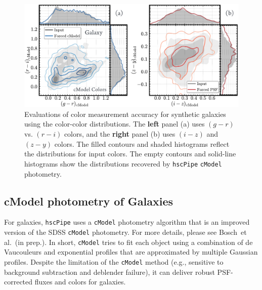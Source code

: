 \documentclass[useamsfonts]{pasj01}
\def\etal{{\ et al.~}}
\def\hscpipe{\texttt{hscPipe}}
\def\cmodel{\texttt{cModel}}
\begin{document}
\begin{figure}
    \begin{center}
        \includegraphics[width=\textwidth]{fig/synpipe_galaxy_cdist}
    \end{center}
    \caption{
        Evaluations of color measurement accuracy for synthetic galaxies
        using the color-color distributions.
        The \textbf{left} panel (a) uses $(g-r)$ vs. $(r-i)$ colors, and the \textbf{right} panel (b)
        uses $(i-z)$ and $(z-y)$ colors.
        The filled contours and shaded histograms reflect the distributions for input
        colors.
        The empty contours and solid-line histograms show the distributions recovered
        by \hscpipe{} \cmodel{} photometry.
        }
    \label{fig:cmodel_cdist}
\end{figure}

\subsection{cModel photometry of Galaxies}
    \label{ssec:cmodel}

  For galaxies, \hscpipe{} uses a \cmodel{} photometry algorithm
     that is an improved version of the SDSS \cmodel{}
    photometry.
    For more details, please see Bosch\etal (in prep.).
    In short, \cmodel{} tries to fit each object using a combination of de Vaucouleurs
    and exponential profiles that are approximated by multiple Gaussian profiles.
    Despite the limitation of the \cmodel{} method (e.g., sensitive to background
    subtraction and deblender failure), it can deliver robust PSF-corrected fluxes and
    colors for galaxies.
\end{document}
